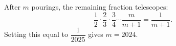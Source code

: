 After $m$ pourings, the remaining fraction telescopes:
\[\dfrac{1}{2}\cdot\dfrac{2}{3}\cdot\dfrac{3}{4}\cdots\dfrac{m}{m+1}=\dfrac{1}{m+1}.\]
Setting this equal to $\dfrac{1}{2025}$ gives $\boxed{m=2024}$.
